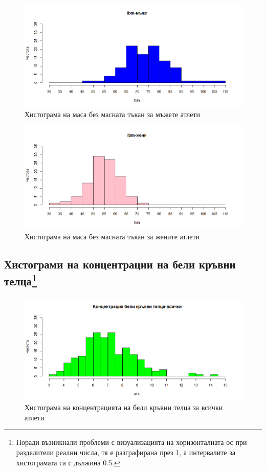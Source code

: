 \documentclass[12pt]{article} %
\begin{document}
\begin{large}
  \begin{figure}[h!]
    \includegraphics[width=\textwidth,height=\textheight,keepaspectratio]{pics/lbmmen}
    \caption{Хистограма на маса без масната тъкан за мъжете атлети}
  \end{figure}

  \begin{figure}[h!]
    \includegraphics[width=\textwidth,height=\textheight,keepaspectratio]{pics/lbmwomen}
    \caption{Хистограма на маса без масната тъкан за жените атлети}
  \end{figure}

  \FloatBarrier
  \subsection[Хистограми на концентрации на бели кръвни телца]{Хистограми на концентрации на бели кръвни телца\footnote{Поради възникнали проблеми с визуализацията на хоризонталната ос при разделители реални числа, тя е разграфирана през 1, а интервалите за хистограмата са с дължина 0.5.}}
  \FloatBarrier

  \begin{figure}[h!]
    \includegraphics[width=\textwidth,height=\textheight,keepaspectratio]{pics/wccall}
    \caption{Хистограма на концентрацията на бели кръвни телца за всички атлети}
  \end{figure}


\end{large}
\end{document}
